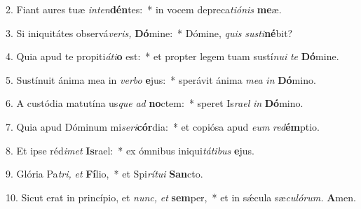 \item 2. Fiant aures tuæ \textit{inten}\textbf{dén}tes:~* in vocem depreca\tinyhspace\textit{tiónis} \textbf{me}æ.
\item 3. Si iniquitátes observá\tinyhspace\textit{veris,} \textbf{Dó}mine:~* Dómine, \textit{quis} \textit{susti}\textbf{né}bit?
\item 4. Quia apud te propiti\tinyhspace\textit{áti}\textbf{o} est:~* et propter legem tuam sustí\textit{nui} \textit{te} \textbf{Dó}mine.
\item 5. Sustínuit ánima mea in \textit{verbo} \textbf{e}jus:~* sperávit ánima \textit{mea} \textit{in} \textbf{Dó}mino.
\item 6. A custódia matutína us\tinyhspace\textit{que} \textit{ad} \textbf{no}ctem:~* speret Is\tinyhspace\textit{rael} \textit{in} \textbf{Dó}mino.
\item 7. Quia apud Dóminum mi\tinyhspace\textit{seri}\textbf{cór}dia:~* et copiósa apud \textit{eum} \textit{red}\textbf{ém}ptio.
\item 8. Et ipse réd\tinyhspace\textit{imet} \textbf{Is}rael:~* ex ómnibus iniqui\tinyhspace\textit{tátibus} \textbf{e}jus.
\item 9. Glória Pa\tinyhspace\textit{tri,} \textit{et} \textbf{Fí}lio,~* et Spi\tinyhspace\textit{rítui} \textbf{San}cto.
\item 10. Sicut erat in princípio, et \textit{nunc,} \textit{et} \textbf{sem}per,~* et in sǽcula sæ\tinyhspace\textit{culórum.} \textbf{A}men.

